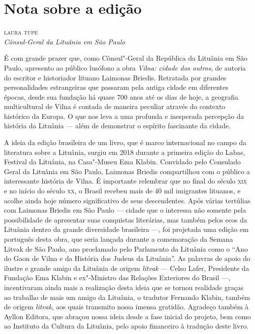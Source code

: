 \chapter[Nota sobre a edição, \textit{por Laura Tupe}]{Nota sobre a edição}

\begin{flushright}
\textsc{laura tupe}\\
\textit{Cônsul-Geral da Lituânia em São Paulo}
\end{flushright}

\noindent{}É com grande prazer que, como Cônsul"-Geral da República da Lituânia em
São Paulo, apresento ao público lusófono a obra \textit{Vilna: cidade dos
outros}, de autoria do escritor e historiador lituano Laimonas Briedis.
Retratada por grandes personalidades estrangeiras que passaram pela
antiga cidade em diferentes épocas, desde sua fundação há quase 700 anos
até os dias de hoje, a geografia multicultural de Vilna é contada
de maneira peculiar através do contexto histórico da Europa. O que nos
leva a uma profunda e inesperada percepção da história da Lituânia ---
além de demonstrar o espírito fascinante da cidade.

A ideia da edição brasileira de um livro, que é marco internacional no
campo da literatura sobre a Lituânia, surgiu em 2018 durante a primeira
edição do Labas, Festival da Lituânia, na Casa"-Museu Ema Klabin.
Convidado pelo Consulado Geral da Lituânia em São Paulo, Laimonas
Briedis compartilhou com o público a interessante história de Vilna. É
importante relembrar que no final do século \textsc{xix} e no início do século
\textsc{xx}, o Brasil recebeu mais de 40 mil imigrantes lituanos, e acolhe ainda
hoje número significativo de seus descendentes. Após várias tertúlias
com Laimonas Briedis em São Paulo --- cidade que o interessa não somente
pela possibilidade de apresentar suas conquistas literárias, mas também
pelos ecos da Lituânia dentro da grande diversidade brasileira ---, foi
projetada uma edição em português desta obra, que seria lançada durante
a comemoração da Semana Litvak de São Paulo, ano proclamado pelo
Parlamento da Lituânia como o ``Ano do Gaon de Vilna e da História
dos Judeus da Lituânia''. As palavras de apoio do ilustre e grande amigo
da Lituânia de origem \textit{litvak} --- Celso Lafer, Presidente da
Fundação Ema Klabin e ex"-Ministro das Relações Exteriores do Brasil ---,
incentivaram ainda mais a realização desta ideia que se tornou realidade
graças ao trabalho de mais um amigo da Lituânia, o tradutor Fernando
Klabin, também de origem \textit{litvak}, aos quais transmito nossa imensa
gratidão. Agradeço também à Ayllon Editora, que abraçou nossa ideia
desde a fase inicial do projeto, bem como ao Instituto da Cultura da
Lituânia, pelo apoio financeiro à tradução deste livro.

